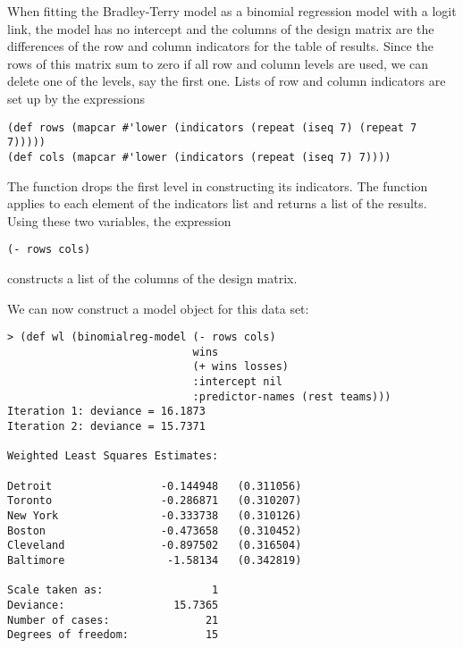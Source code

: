 When fitting the Bradley-Terry model as a binomial regression model
with a logit link, the model has no intercept and the columns of the
design matrix are the differences of the row and column indicators for
the table of results.  Since the rows of this matrix sum to zero if
all row and column levels are used, we can delete one of the levels,
say the first one. Lists of row and column indicators are set up by
the expressions
\begin{verbatim}
(def rows (mapcar #'lower (indicators (repeat (iseq 7) (repeat 7 7)))))
(def cols (mapcar #'lower (indicators (repeat (iseq 7) 7))))
\end{verbatim}
The function  drops the first level in constructing
its indicators. The function  applies  to
each element of the indicators list and returns a list of the results.
Using these two variables, the expression
\begin{verbatim}
(- rows cols)
\end{verbatim}
constructs a list of the columns of the design matrix.

We can now construct a model object for this data set:
\begin{verbatim}
> (def wl (binomialreg-model (- rows cols)
                             wins
                             (+ wins losses)
                             :intercept nil
                             :predictor-names (rest teams)))
Iteration 1: deviance = 16.1873
Iteration 2: deviance = 15.7371

Weighted Least Squares Estimates:

Detroit                 -0.144948   (0.311056)
Toronto                 -0.286871   (0.310207)
New York                -0.333738   (0.310126)
Boston                  -0.473658   (0.310452)
Cleveland               -0.897502   (0.316504)
Baltimore                -1.58134   (0.342819)

Scale taken as:                 1
Deviance:                 15.7365
Number of cases:               21
Degrees of freedom:            15
\end{verbatim}

